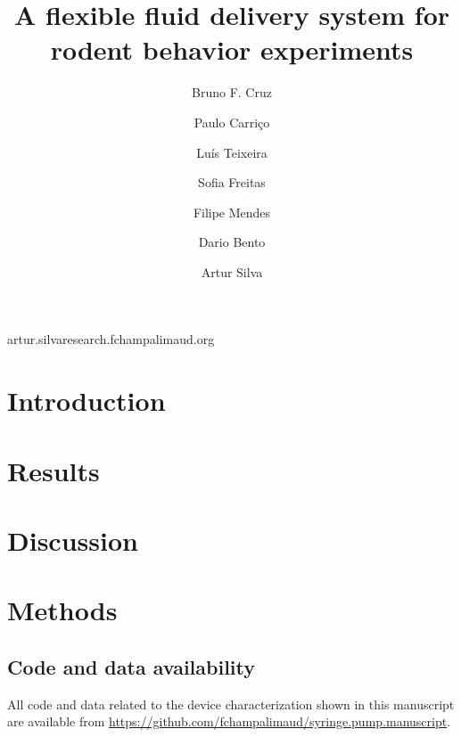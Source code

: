 
\title{A flexible fluid delivery system for rodent behavior experiments}
\shorttitle{}

\author[1,2,3]{Bruno F. Cruz}
\author[1]{Paulo Carriço}
\author[1]{Luís Teixeira}
\author[1]{Sofia Freitas}
\author[1]{Filipe Mendes}
\author[1]{Dario Bento}
\author[1,\Letter]{Artur Silva}
\date{}

\maketitle

\begin{abstract}


\end{abstract}


\begin{corrauthor}
artur.silva\at research.fchampalimaud.org
\end{corrauthor}

\section*{Introduction}\label{s:introduction}


\section*{Results}\label{s:results}


\section*{Discussion}\label{s:discussion}


\section*{Methods}\label{s:methods}


\subsection*{Code and data availability}\label{s:code_availability}
All code and data related to the device characterization shown in this manuscript are available from \url{https://github.com/fchampalimaud/syringe.pump.manuscript}.

